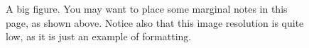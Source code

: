 \documentclass{chi-ext}
\begin{document}
\clearpage
{}
\begin{figure}
\hspace*{-0.5\textwidth}%
\parbox{\textwidth}{
  \begin{center}
  \caption{A big figure. You may want to place some marginal notes in this page, as shown above. Notice also that this image resolution is quite low, as it is just an example of formatting.}
  \label{fig:bigsample}
  \end{center}  
}
\end{figure}


\end{document}
